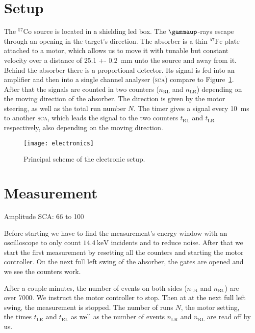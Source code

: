 \documentclass[11pt, english, fleqn, DIV=15, headinclude, BCOR=2cm]{scrreprt}
\newcommand\tRL{t_\text{RL}}
\newcommand\tLR{t_\text{LR}}
\newcommand\nRL{n_\text{RL}}
\newcommand\nLR{n_\text{LR}}
\begin{document}
\section{Setup}

The $^{57}\mathrm{Co}$ source is located in a shielding led box. The
$\gammaup$-rays escape through an opening in the target's direction. The
absorber is a thin $^{57}\mathrm{Fe}$ plate attached to a motor, which allows
us to move it with tunable but constant velocity over a distance of \SI{25.1 +-
0.2}{\milli\meter} unto the source and away from it. Behind the absorber there
is a proportional detector. Its signal is fed into an amplifier and then into a
single channel analyser (\textsc{sca}) compare to Figure~\ref{fig:electronics}.
After that the signals are counted in two counters ($n_\text{RL}$ and
$n_\text{LR}$) depending on the moving direction of the absorber. The direction
is given by the motor steering, as well as the total run number $N$. The timer
gives a signal every \SI{10}{\milli\second} to another \textsc{sca}, which
leads the signal to the two counters $t_\text{RL}$ and $t_\text{LR}$
respectively, also depending on the moving direction.

\begin{figure}
    \centering
    \texttt{[image: electronics]}
    \caption{%
        Principal scheme of the electronic setup.
    }
    \label{fig:electronics}
\end{figure}


\section{Measurement}

Amplitude SCA: 66 to 100

Before starting we have to find the measurement's energy window with an
oscilloscope to only count $\SI{14.4}{\kilo\electronvolt}$ incidents and to
reduce noise. After that we start the first measurement by resetting all the
counters and starting the motor controller. On the next full left swing of the
absorber, the gates are opened and we see the counters work.

After a couple minutes, the number of events on both sides ($\nLR$ and $\nRL$)
are over \num{7000}. We instruct the motor controller to stop. Then at at the
next full left swing, the measurement is stopped. The number of runs $N$, the
motor setting, the times $\tLR$ and $\tRL$ as well as the number of events
$\nLR$ and $\nRL$ are read off by us.
\end{document}
